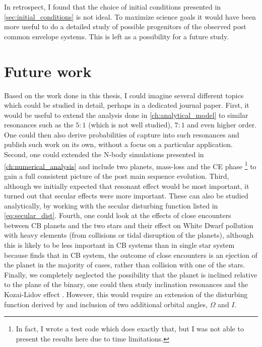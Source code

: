 \documentclass[twoside,openright,titlepage,numbers=noenddot,headinclude,%
                footinclude=true,cleardoublepage=empty,abstractoff, 
                BCOR=5mm,paper=a4,fontsize=11pt,%
                american,%
                ]{scrreprt}%
\begin{document}
In retrospect, I found that the choice of initial conditions presented in 
\cref{sec:initial_conditions} is not ideal. To maximize science goals 
it would have been more useful to do a detailed study of possible progenitors
of the observed post common envelope systems. This is left as a possibility
for a future study.

\section{Future work}
\label{sec:Future work}
Based on the work done in this thesis, I could imagine several different 
topics which could be studied in detail, perhaps in a dedicated
journal paper. First, it would be useful to extend the analysis done
in \cref{ch:analytical_model} to similar resonances such as the 
$5:1$ (which is not well studied), $7:1$ and even higher order. One could
then also derive probabilities of capture into such resonances and publish
such work on its own, without a focus on a particular application. Second,
one could extended the N-body simulations presented in 
\cref{ch:numerical_analysis} and include  two planets, mass-loss 
and the CE phase \footnote{In fact, I wrote a test 
code which does exactly that, but I was not
able to present the results here due to time limitations.} to gain a 
full consistent picture of the post main sequence evolution. Third, 
although we initially expected that resonant effect would be most important,
it turned out that secular effects were more important. These can also
be studied analytically, by working with the secular disturbing function
listed in \cref{eq:secular_dist}. Fourth, one could look at the effects 
of close encounters between CB planets and the two stars and their effect
on White Dwarf pollution with heavy elements (from collisions or tidal 
disruption of the planets), although this is likely to be
less important in CB systems than in single star system because 
\citet{Smullen2016a} finds that in CB system, the outcome of close encounters
is an ejection of the planet in the majority of cases, rather than collision
with one of the stars.
Finally, we completely neglected
the possibility that the planet is inclined relative to the plane
of the binary, one could then study inclination resonances and the 
Kozai-Lidov effect \citep{Kozai}. However, this would require 
an extension of the disturbing function derived by \citet{Mardling2013} and 
inclusion of two additional orbital angles, $\Omega$ and $I$.

\cleardoublepage
%
\cleardoublepage
\end{document}
